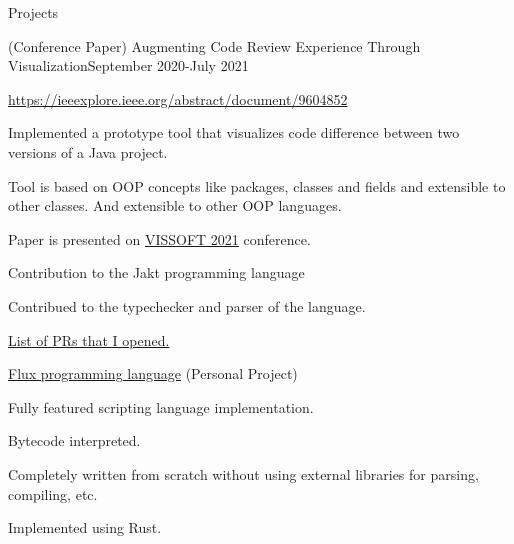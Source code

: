 \documentclass{resume} %
\begin{document}
\begin{rSection}{Projects}

\begin{rSubsection}{(Conference Paper) Augmenting Code Review Experience Through Visualization}{September 2020-July 2021}{}{}
    \item \url{https://ieeexplore.ieee.org/abstract/document/9604852}
    \item Implemented a prototype tool that visualizes code difference between two versions of a Java project.
    \item Tool is based on OOP concepts like packages, classes and fields and extensible to other classes. And extensible to other OOP languages.
    \item Paper is presented on \href{https://vissoft.info/2021/}{VISSOFT 2021} conference.
\end{rSubsection}

\begin{rSubsection}{Contribution to the Jakt programming language}{}{}{}
    \item Contribued to the typechecker and parser of the language.
    \item \href{https://github.com/SerenityOS/jakt/pulls?q=is%3Apr+author%3Aonsah}{List of PRs that I opened.}
\end{rSubsection}

\begin{rSubsection}{\href{https://github.com/onsah/Flux_rs/}{Flux programming language} (Personal Project)}{}{}{}
    \item Fully featured scripting language implementation.
    \item Bytecode interpreted.
    \item Completely written from scratch without using external libraries for parsing, compiling, etc.
    \item Implemented using Rust.
\end{rSubsection}
    
\end{rSection}

\end{document}
